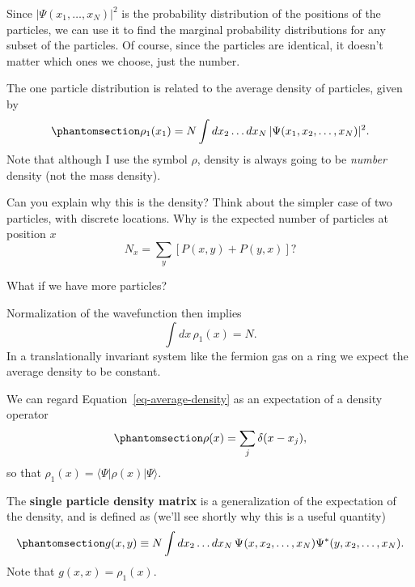 \documentclass[
  letterpaper,
  DIV=11,
  numbers=noendperiod]{scrreprt}
\begin{document}
Since \(\lvert\Psi(x_1,\ldots,x_N)\rvert^2\) is the probability
distribution of the positions of the particles, we can use it to find
the marginal probability distributions for any subset of the particles.
Of course, since the particles are identical, it doesn't matter which
ones we choose, just the number.

The one particle distribution is related to the average density of
particles, given by
\begin{equation}\phantomsection\label{eq-average-density}{
\rho_1(x_1) = N \int dx_2\ldots dx_N \,\lvert\Psi(x_1,x_2,\ldots,x_N)\rvert^2.
}\end{equation} Note that although I use the symbol \(\rho\), density is
always going to be \emph{number} density (not the mass density).

\begin{tcolorbox}[enhanced jigsaw, colback=white, bottomrule=.15mm, left=2mm, colbacktitle=quarto-callout-tip-color!10!white, breakable, colframe=quarto-callout-tip-color-frame, leftrule=.75mm, opacitybacktitle=0.6, opacityback=0, bottomtitle=1mm, toptitle=1mm, titlerule=0mm, title=\textcolor{quarto-callout-tip-color}{\faLightbulb}\hspace{0.5em}{Check}, toprule=.15mm, arc=.35mm, coltitle=black, rightrule=.15mm]

Can you explain why this is the density? Think about the simpler case of
two particles, with discrete locations. Why is the expected number of
particles at position \(x\) \[
N_x = \sum_y \left[P(x,y) + P(y,x)\right]?
\]

What if we have more particles?

\end{tcolorbox}

Normalization of the wavefunction then implies \[
\int dx\, \rho_1(x) = N.
\] In a translationally invariant system like the fermion gas on a ring
we expect the average density to be constant.

We can regard Equation~\ref{eq-average-density} as an expectation of a
density operator \begin{equation}\phantomsection\label{eq-density-op}{
\rho(x) = \sum_j \delta(x-x_j),
}\end{equation} so that
\(\rho_1(x) = \langle{\Psi}\rvert \rho(x) \lvert \Psi \rangle\).

The \textbf{single particle density matrix} is a generalization of the
expectation of the density, and is defined as (we'll see shortly why
this is a useful quantity)
\begin{equation}\phantomsection\label{eq-spdm}{
g(x,y) \equiv N\int dx_2\ldots dx_N \,\Psi^{}(x,x_2,\ldots,x_N)\Psi^{*}(y,x_2,\ldots,x_N).
}\end{equation} Note that \(g(x,x) = \rho_1(x)\).
\end{document}

